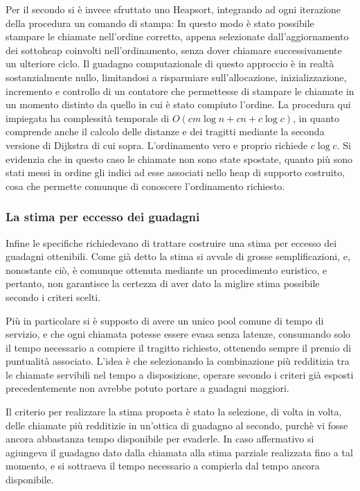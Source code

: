 \documentclass[a4paper,11pt]{Article}
\begin{document}
Per il secondo si è invece sfruttato uno Heapsort, integrando ad ogni iterazione della procedura un comando di stampa: In questo modo è stato possibile stampare le chiamate nell'ordine corretto, appena selezionate dall'aggiornamento dei sottoheap coinvolti nell'ordinamento, senza dover chiamare successivamente un ulteriore ciclo. Il guadagno computazionale di questo approccio è in realtà sostanzialmente nullo, limitandosi a risparmiare sull'allocazione, inizializzazione, incremento e controllo di un contatore che permettesse di stampare le chiamate in un momento distinto da quello in cui è stato compiuto l'ordine. La procedura qui impiegata ha complessità temporale di $O(cm\log{n} + cn + c\log{c})$, in quanto comprende anche il calcolo delle distanze e dei tragitti mediante la seconda versione di Dijkstra di cui sopra. L'ordinamento vero e proprio richiede $c\log{c}$.
Si evidenzia che in questo caso le chiamate non sono state spostate, quanto più sono stati messi in ordine gli indici ad esse associati nello heap di supporto costruito, cosa che permette comunque di conoscere l'ordinamento richiesto.

\subsubsection{La stima per eccesso dei guadagni}

Infine le specifiche richiedevano di trattare costruire una stima per eccesso dei guadagni ottenibili. Come già detto la stima si avvale di grosse semplificazioni, e, nonostante ciò, è comunque ottenuta mediante un procedimento euristico, e pertanto, non garantisce la certezza di aver dato la miglire stima possibile secondo i criteri scelti.

Più in particolare si è supposto di avere un unico pool comune di tempo di servizio, e che ogni chiamata potesse essere evasa senza latenze, consumando solo il tempo necessario a compiere il tragitto richiesto, ottenendo sempre il premio di puntualità associato.
L'idea è che selezionando la combinazione più redditizia tra le chiamate servibili nel tempo a disposizione, operare secondo i criteri già esposti precedentemente non avrebbe potuto portare a guadagni maggiori.

Il criterio per realizzare la stima proposta è stato la selezione, di volta in volta, delle chiamate più redditizie in un'ottica di guadagno al secondo, purchè vi fosse ancora abbastanza tempo disponibile per evaderle. In caso affermativo si agiungeva il guadagno dato dalla chiamata alla stima parziale realizzata fino a tal momento, e si sottraeva il tempo necessario a compierla dal tempo ancora disponibile.
\end{document}
